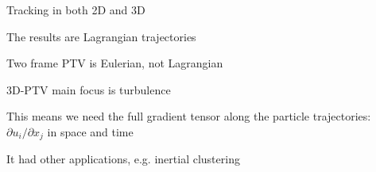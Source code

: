 \begin{frame}[label=ptv-61c]{Tracking in both 2D and 3D}
	\centering{}
\end{frame}

			

\begin{frame}[label=ptv-7]{The results are Lagrangian trajectories}
\centering
{}
\end{frame}

\begin{frame}[label=ptv-71]{Two frame PTV is Eulerian, not Lagrangian}
\centering{}
\end{frame}



    
\begin{frame}[label=app-13]{3D-PTV main focus is turbulence}
    \begin{cardTiny} 
    This means we need  the \alert{full gradient tensor} along the particle trajectories:
    $\partial u_{i}/\partial x_{j}$ in space and time
    \end{cardTiny}
    \begin{multicols}{2}
    \centering
    \end{multicols}
    \end{frame}
    
    \begin{frame}[label=app-14]{It had other applications, e.g. inertial clustering}
    \centering{}
    \end{frame}
    


